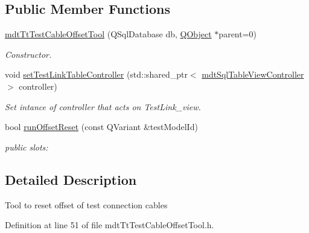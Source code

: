 \subsection*{Public Member Functions}
\begin{DoxyCompactItemize}
\item 
\hyperlink{classmdt_tt_test_cable_offset_tool_ab09f443d0d7720c54625228e7e70088b}{mdt\-Tt\-Test\-Cable\-Offset\-Tool} (Q\-Sql\-Database db, \hyperlink{class_q_object}{Q\-Object} $\ast$parent=0)
\begin{DoxyCompactList}\small\item\em Constructor. \end{DoxyCompactList}\item 
void \hyperlink{classmdt_tt_test_cable_offset_tool_a2ebde2cd3e205b4da7fc1d73766d3e9c}{set\-Test\-Link\-Table\-Controller} (std\-::shared\-\_\-ptr$<$ \hyperlink{classmdt_sql_table_view_controller}{mdt\-Sql\-Table\-View\-Controller} $>$ controller)
\begin{DoxyCompactList}\small\item\em Set intance of controller that acts on Test\-Link\-\_\-view. \end{DoxyCompactList}\item 
bool \hyperlink{classmdt_tt_test_cable_offset_tool_adc55a81199c41f03fb98cfa4899985db}{run\-Offset\-Reset} (const Q\-Variant \&test\-Model\-Id)
\begin{DoxyCompactList}\small\item\em public slots\-: \end{DoxyCompactList}\end{DoxyCompactItemize}


\subsection{Detailed Description}
Tool to reset offset of test connection cables 

Definition at line 51 of file mdt\-Tt\-Test\-Cable\-Offset\-Tool.\-h.



